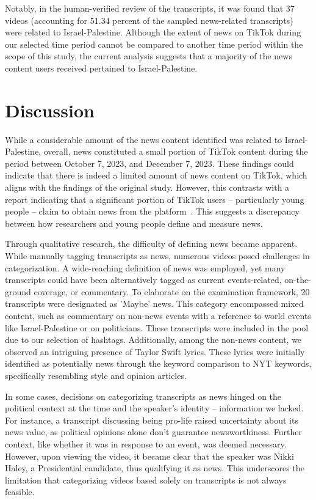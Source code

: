 \documentclass{article}
\begin{document}
{\noindent}Notably, in the human-verified review of the transcripts, it was found that 37 videos (accounting for 51.34 percent of the sampled news-related transcripts) were related to Israel-Palestine. Although the extent of news on TikTok during our selected time period cannot be compared to another time period within the scope of this study, the current analysis suggests that a majority of the news content users received pertained to Israel-Palestine.


\section{Discussion}
{\noindent}While a considerable amount of the news content identified was related to Israel-Palestine, overall, news constituted a small portion of TikTok content during the period between October 7, 2023, and December 7, 2023. These findings could indicate that there is indeed a limited amount of news content on TikTok, which aligns with the findings of the original study\cite{hagar2023algorithmic}. However, this contrasts with a report indicating that a significant portion of TikTok users – particularly young people – claim to obtain news from the platform~\cite{pewresearch2023}. This suggests a discrepancy between how researchers and young people define and measure news. \newline

{\noindent}Through qualitative research, the difficulty of defining news became apparent. While manually tagging transcripts as news, numerous videos posed challenges in categorization. A wide-reaching definition of news was employed, yet many transcripts could have been alternatively tagged as current events-related, on-the-ground coverage, or commentary. To elaborate on the examination framework, 20 transcripts were designated as 'Maybe' news. This category encompassed mixed content, such as commentary on non-news events with a reference to world events like Israel-Palestine or on politicians. These transcripts were included in the pool due to our selection of hashtags. Additionally, among the non-news content, we observed an intriguing presence of Taylor Swift lyrics. These lyrics were initially identified as potentially news through the keyword comparison to NYT keywords, specifically resembling style and opinion articles.~\newline

{\noindent}In some cases, decisions on categorizing transcripts as news hinged on the political context at the time and the speaker's identity – information we lacked. For instance, a transcript discussing being pro-life raised uncertainty about its news value, as political opinions alone don't guarantee newsworthiness. Further context, like whether it was in response to an event, was deemed necessary. However, upon viewing the video, it became clear that the speaker was Nikki Haley, a Presidential candidate, thus qualifying it as news. This underscores the limitation that categorizing videos based solely on transcripts is not always feasible.\newline
\end{document}
